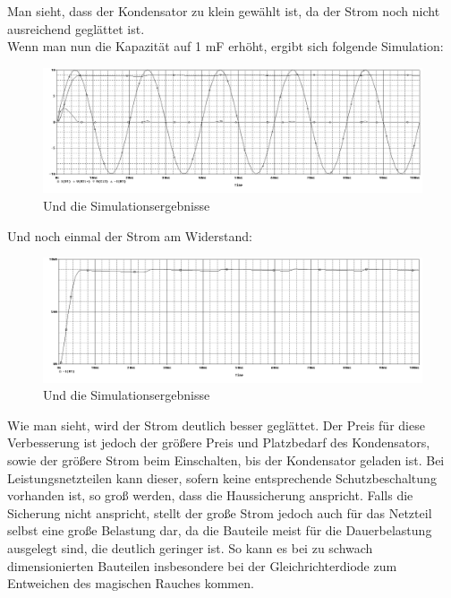 Man sieht, dass der Kondensator zu klein gewählt ist, da der Strom noch nicht ausreichend geglättet ist.\\
Wenn man nun die Kapazität auf 1 mF erhöht, ergibt sich folgende Simulation:
\begin{figure}[H]
	\centering
	\includegraphics[width=\linewidth]{versuch2/spice/v2_5_3_simulation.png}
	\caption{Und die Simulationsergebnisse}
\end{figure}
Und noch einmal der Strom am Widerstand:
\begin{figure}[H]
	\centering
	\includegraphics[width=\linewidth]{versuch2/spice/v2_5_3_strom_simulation.png}
	\caption{Und die Simulationsergebnisse}
\end{figure}
Wie man sieht, wird der Strom deutlich besser geglättet. Der Preis für diese Verbesserung ist jedoch der größere Preis und Platzbedarf des Kondensators, sowie der größere Strom beim Einschalten, bis der Kondensator geladen ist. Bei Leistungsnetzteilen kann dieser, sofern keine entsprechende Schutzbeschaltung vorhanden ist, so groß werden, dass die Haussicherung anspricht. Falls die Sicherung nicht anspricht, stellt der große Strom jedoch auch für das Netzteil selbst eine große Belastung dar, da die Bauteile meist für die Dauerbelastung ausgelegt sind, die deutlich geringer ist. So kann es bei zu schwach dimensionierten Bauteilen insbesondere bei der Gleichrichterdiode zum Entweichen des magischen Rauches kommen.

